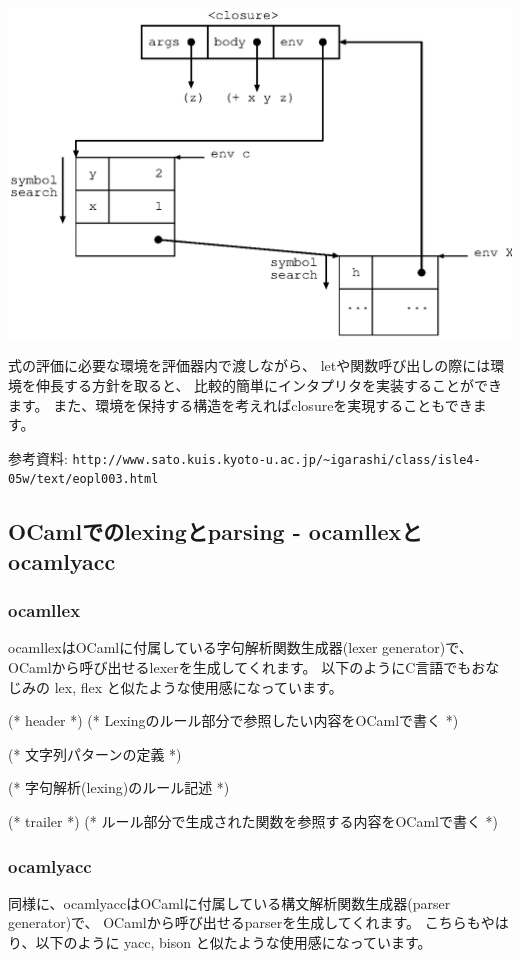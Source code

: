 \documentclass[mingoth,a4paper]{jsarticle}
\begin{document}
 \includegraphics[height=0.4\hsize]{image201002/caml-env02.eps}

式の評価に必要な環境を評価器内で渡しながら、
letや関数呼び出しの際には環境を伸長する方針を取ると、
比較的簡単にインタプリタを実装することができます。
また、環境を保持する構造を考えればclosureを実現することもできます。

 参考資料: \verb|http://www.sato.kuis.kyoto-u.ac.jp/~igarashi/class/isle4-05w/text/eopl003.html|

\subsection{OCamlでのlexingとparsing - ocamllexとocamlyacc}

\subsubsection{ocamllex}

ocamllexはOCamlに付属している字句解析関数生成器(lexer generator)で、
OCamlから呼び出せるlexerを生成してくれます。
以下のようにC言語でもおなじみの lex, flex と似たような使用感になっています。

\begin{commandline}

{
  (* header *)
  (* Lexingのルール部分で参照したい内容をOCamlで書く *)
}

(* 文字列パターンの定義 *)

(* 字句解析(lexing)のルール記述 *)

{
  (* trailer *)
  (* ルール部分で生成された関数を参照する内容をOCamlで書く *)
}

\end{commandline}

\subsubsection{ocamlyacc}

同様に、ocamlyaccはOCamlに付属している構文解析関数生成器(parser generator)で、
OCamlから呼び出せるparserを生成してくれます。
こちらもやはり、以下のように yacc, bison と似たような使用感になっています。
\end{document}
